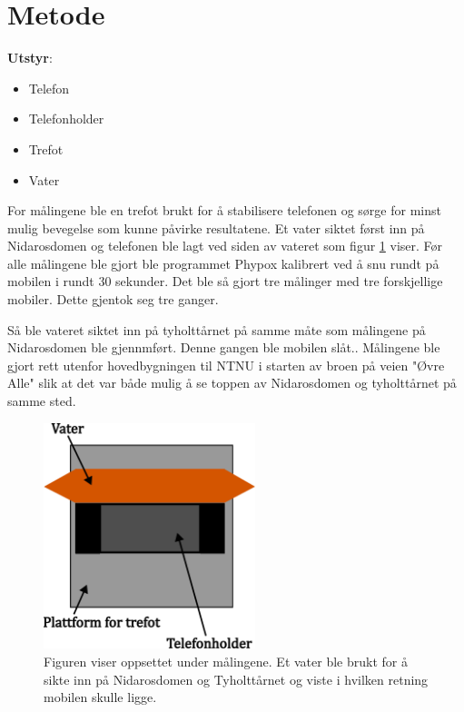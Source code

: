 \section{Metode}
\noindent\textbf{Utstyr}:
\begin{itemize}
    \item Telefon
    \item Telefonholder
    \item Trefot
    \item Vater
\end{itemize}
  
For målingene ble en trefot brukt for å stabilisere telefonen og sørge for minst mulig bevegelse som kunne påvirke resultatene. Et vater siktet først inn på Nidarosdomen og telefonen ble lagt ved siden av vateret som figur \ref{fig:med_vater} viser. Før alle målingene ble gjort ble programmet Phypox kalibrert ved å snu rundt på mobilen i rundt 30 sekunder. Det ble så gjort tre målinger med tre forskjellige mobiler. Dette gjentok seg tre ganger.

Så ble vateret siktet inn på tyholttårnet på samme måte som målingene på Nidarosdomen ble gjennmført. Denne gangen ble mobilen slåt..
Målingene ble gjort rett utenfor hovedbygningen til NTNU i starten av broen på veien "Øvre Alle" slik at det var både mulig å se toppen av Nidarosdomen og tyholttårnet på samme sted.  

\begin{figure}
    \centering
    \includegraphics[width=0.55\textwidth]{img/Plattform med vater.pdf}
    \caption{Figuren viser oppsettet under målingene. Et vater ble brukt for å sikte inn på Nidarosdomen og Tyholttårnet og viste i hvilken retning mobilen skulle ligge. 
        }
    \label{fig:med_vater}
\end{figure}